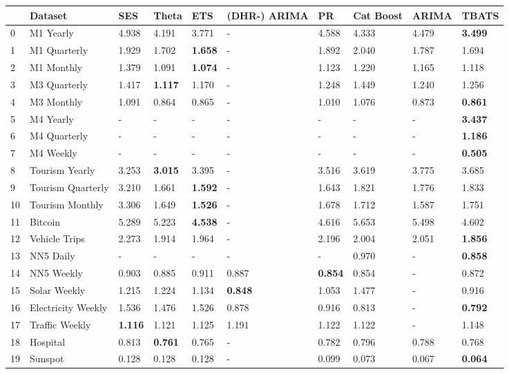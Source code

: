 \begin{tabular}{llllllllll}
\toprule
 & Dataset & SES & Theta & ETS & (DHR-) ARIMA & PR & Cat Boost & ARIMA & TBATS \\
\midrule
0 & M1 Yearly & 4.938 & 4.191 & 3.771 & - & 4.588 & 4.333 & 4.479 & \textbf{3.499} \\
1 & M1 Quarterly & 1.929 & 1.702 & \textbf{1.658} & - & 1.892 & 2.040 & 1.787 & 1.694 \\
2 & M1 Monthly & 1.379 & 1.091 & \textbf{1.074} & - & 1.123 & 1.220 & 1.165 & 1.118 \\
3 & M3 Quarterly & 1.417 & \textbf{1.117} & 1.170 & - & 1.248 & 1.449 & 1.240 & 1.256 \\
4 & M3 Monthly & 1.091 & 0.864 & 0.865 & - & 1.010 & 1.076 & 0.873 & \textbf{0.861} \\
5 & M4 Yearly & - & - & - & - & - & - & - & \textbf{3.437} \\
6 & M4 Quarterly & - & - & - & - & - & - & - & \textbf{1.186} \\
7 & M4 Weekly & - & - & - & - & - & - & - & \textbf{0.505} \\
8 & Tourism Yearly & 3.253 & \textbf{3.015} & 3.395 & - & 3.516 & 3.619 & 3.775 & 3.685 \\
9 & Tourism Quarterly & 3.210 & 1.661 & \textbf{1.592} & - & 1.643 & 1.821 & 1.776 & 1.833 \\
10 & Tourism Monthly & 3.306 & 1.649 & \textbf{1.526} & - & 1.678 & 1.712 & 1.587 & 1.751 \\
11 & Bitcoin & 5.289 & 5.223 & \textbf{4.538} & - & 4.616 & 5.653 & 5.498 & 4.602 \\
12 & Vehicle Trips & 2.273 & 1.914 & 1.964 & - & 2.196 & 2.004 & 2.051 & \textbf{1.856} \\
13 & NN5 Daily & - & - & - & - & - & 0.970 & - & \textbf{0.858} \\
14 & NN5 Weekly & 0.903 & 0.885 & 0.911 & 0.887 & \textbf{0.854} & 0.854 & - & 0.872 \\
15 & Solar Weekly & 1.215 & 1.224 & 1.134 & \textbf{0.848} & 1.053 & 1.477 & - & 0.916 \\
16 & Electricity Weekly & 1.536 & 1.476 & 1.526 & 0.878 & 0.916 & 0.813 & - & \textbf{0.792} \\
17 & Traffic Weekly & \textbf{1.116} & 1.121 & 1.125 & 1.191 & 1.122 & 1.122 & - & 1.148 \\
18 & Hospital & 0.813 & \textbf{0.761} & 0.765 & - & 0.782 & 0.796 & 0.788 & 0.768 \\
19 & Sunspot & 0.128 & 0.128 & 0.128 & - & 0.099 & 0.073 & 0.067 & \textbf{0.064} \\

\end{tabular}
